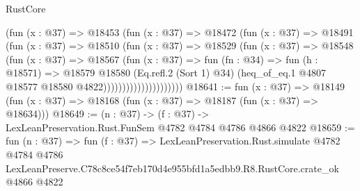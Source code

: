 \begin{lexlean}{RustCore}
\begin{coremodule}
                            (fun (x : @37) =>
                            @18453
                              (fun (x : @37) =>
                              @18472
                                (fun (x : @37) =>
                                @18491
                                  (fun (x : @37) =>
                                  @18510
                                    (fun (x : @37) =>
                                    @18529
                                      (fun (x : @37) =>
                                      @18548
                                        (fun (x : @37) =>
                                        @18567
                                          (fun (x : @37) =>
                                          fun (fn : @34) =>
                                          fun (h : @18571) =>
                                          @18579
                                            @18580
                                            (Eq.refl.{2} (Sort 1) @34)
                                            (heq_of_eq.{1}
                                              @4807
                                              @18577
                                              @18580
                                              @4822)))))))))))))))))))))
@18641 := fun (x : @37) =>
  @18149 (fun (x : @37) => @18168 (fun (x : @37) => @18187 (fun (x : @37) => @18634)))
@18649 := (n : @37) -> (f : @37) -> LexLeanPreservation.Rust.FunSem @4782 @4784 @4786 @4866 @4822
@18659 := fun (n : @37) =>
  fun (f : @37) =>
  LexLeanPreservation.Rust.simulate
    @4782
    @4784
    @4786
    LexLeanPreserve.C78c8ce54f7eb170d4e955bfd1a5edbb9.R8.RustCore.crate_ok
    @4866
    @4822
\end{coremodule}
\end{lexlean}
